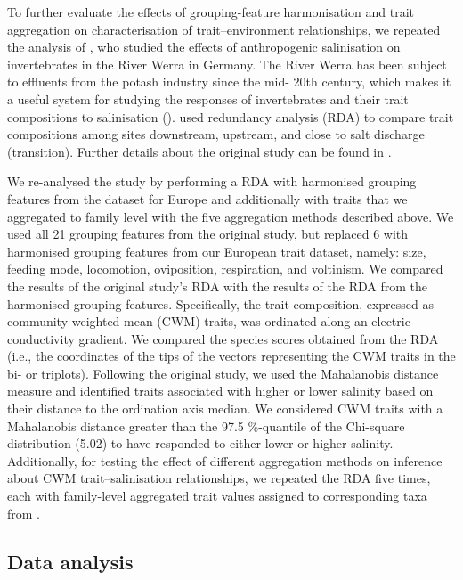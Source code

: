 \documentclass{article}
\begin{document}
To further evaluate the effects of grouping-feature harmonisation and trait aggregation on characterisation of trait–environment relationships, we repeated the analysis of \citet{szocs_effects_2014}, who studied the effects of anthropogenic salinisation on invertebrates in the River Werra in Germany. The River Werra has been subject to effluents from the potash industry since the mid- 20th century, which makes it a useful system for studying the responses of invertebrates and their trait compositions to salinisation (\cite{bathe_biological_2011}). \citet{szocs_effects_2014}  used redundancy analysis (RDA) to compare trait compositions among sites downstream, upstream, and close to salt discharge (transition). Further details about the original study can be found in \citet{szocs_effects_2014}.

We re-analysed the \citet{szocs_effects_2014} study by performing a RDA with harmonised grouping features from the dataset for Europe and additionally with traits that we aggregated to family level with the five aggregation methods described above. We used all 21 grouping features from the original study, but replaced 6 with harmonised grouping features from our European trait dataset, namely: size, feeding mode, locomotion, oviposition, respiration, and voltinism.
We compared the results of the original study’s RDA with the results of the RDA from the harmonised grouping features. Specifically, the trait composition, expressed as community weighted mean (CWM) traits, was ordinated along an electric conductivity gradient. We compared the species scores obtained from the RDA (i.e., the coordinates of the tips of the vectors representing the CWM traits in the bi- or triplots). Following the original study, we used the Mahalanobis distance measure and identified traits associated with higher or lower salinity based on their distance to the ordination axis median. We considered CWM traits with a Mahalanobis distance greater than the 97.5 \%-quantile of the Chi-square distribution (5.02) to have responded to either lower or higher salinity. Additionally, for testing the effect of different aggregation methods on inference about CWM trait–salinisation relationships, we repeated the RDA five times, each with family-level aggregated trait values assigned to corresponding taxa from \citet{szocs_effects_2014}.


\subsection*{Data analysis}
\end{document}
